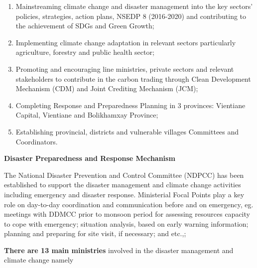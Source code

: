 \begin{enumerate}

\item Mainstreaming climate change and disaster management into the key sectors' policies, strategies, action plans, NSEDP 8 (2016-2020) and contributing to the achievement of SDGs and Green Growth;
\item Implementing climate change adaptation in relevant sectors particularly agriculture, forestry and public health sector;
\item Promoting and encouraging line ministries, private sectors and relevant stakeholders to contribute in the carbon trading through Clean Development Mechanism (CDM) and Joint Crediting Mechanism (JCM);
\item Completing Response and Preparedness Planning in 3 provinces: Vientiane Capital, Vientiane and Bolikhamxay Province;
\item Establishing provincial, districts and vulnerable villages Committees and Coordinators.

\end{enumerate}

{\flushleft \bfseries Disaster Preparedness and Response Mechanism}

The National Disaster Prevention and Control Committee (NDPCC) has been established to support the disaster management and climate change activities including emergency and disaster response. Ministerial Focal Points play a key role on day-to-day coordination and communication before and on emergency, eg. meetings with DDMCC prior to monsoon period for assessing resources capacity to cope with emergency; situation analysis, based on early warning information; planning and preparing for site visit, if necessary; and etc.,;

\vspace{0.4 cm}

\textbf{There are 13 main ministries} involved in the disaster management and climate change namely

